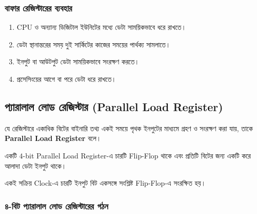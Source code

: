 \subsubsection*{বাফার রেজিস্টারের ব্যবহার}

\begin{enumerate}[leftmargin=*,itemsep=2pt]

    \item \textenglish{CPU} ও অন্যান্য ডিজিটাল ইউনিটের মধ্যে
    ডেটা সাময়িকভাবে ধরে রাখতে।

    \item ডেটা স্থানান্তরের সময় দুই সার্কিটের কাজের সময়ের পার্থক্য
    সামলাতে।

    \item ইনপুট বা আউটপুট ডেটা সাময়িকভাবে সংরক্ষণ করতে।

    \item প্রসেসিংয়ের আগে বা পরে ডেটা ধরে রাখতে।

\end{enumerate}



\subsection{প্যারালাল লোড রেজিস্টার
(\textenglish{Parallel Load Register})}

যে রেজিস্টারে একাধিক বিটের বাইনারি তথ্য একই সময়ে পৃথক ইনপুটের মাধ্যমে
গ্রহণ ও সংরক্ষণ করা যায়, তাকে
\textbf{\textenglish{Parallel Load Register}} বলে।

একটি \(4\)-\textenglish{bit Parallel Load Register}-এ
চারটি \textenglish{Flip-Flop} থাকে এবং প্রতিটি বিটের জন্য
একটি করে আলাদা ডেটা ইনপুট থাকে।

একই সক্রিয় \textenglish{Clock}-এ চারটি ইনপুট বিট
একসঙ্গে সংশ্লিষ্ট \textenglish{Flip-Flop}-এ সংরক্ষিত হয়।



\subsubsection*{৪-বিট প্যারালাল লোড রেজিস্টারের গঠন}

